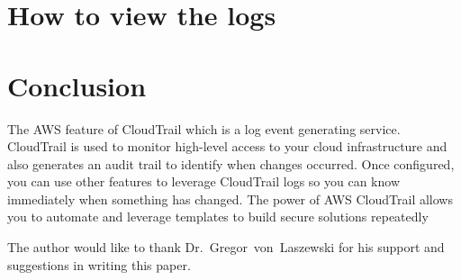 \section{How to view the logs}



\section{Conclusion}

The AWS feature of CloudTrail which is a log event generating service. CloudTrail 
is used to monitor high-level access to your cloud infrastructure and also 
generates an audit trail to identify when changes occurred. Once configured, you 
can use other features to leverage CloudTrail logs so you can know immediately 
when something has changed. The power of AWS CloudTrail allows you to automate and 
leverage templates to build secure solutions repeatedly

\begin{acks}

The author would like to thank Dr.~Gregor~von~Laszewski for his support and 
suggestions in writing this paper.

\end{acks}


 

